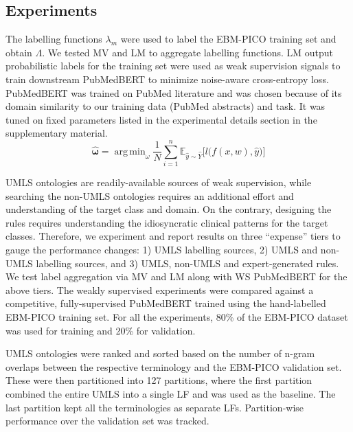 \documentclass[10.7pt,]{article}
\DeclareMathOperator*{\argmin}{arg\,min}
\begin{document}
\subsection{Experiments}\label{subsec:experiments}
%
The labelling functions $\lambda_{m}$ were used to label the EBM-PICO training set and obtain $\Lambda$. 
We tested MV and LM to aggregate labelling functions.
LM output probabilistic labels for the training set were used as weak supervision signals to train downstream PubMedBERT to minimize noise-aware cross-entropy loss.
PubMedBERT was trained on PubMed literature and was chosen because of its domain similarity to our training data (PubMed abstracts) and task.\cite{gu2021domain}
It was tuned on fixed parameters listed in the experimental details section in the supplementary material. 
%
\begin{equation}
\bm{\hat{\omega}} = \argmin_{\omega} \frac{1}{N} \sum_{i=1}^{n} \mathbb{ E }_{ \hat{y} \sim \hat{Y}} \big[ l \big( f(x, w), \hat{y} \big) \big]
\end{equation}
%

UMLS ontologies are readily-available sources of weak supervision, while searching the non-UMLS ontologies requires an additional effort and understanding of the target class and domain.
On the contrary, designing the rules requires understanding the idiosyncratic clinical patterns for the target classes.
Therefore, we experiment and report results on three ``expense'' tiers to gauge the performance changes: 1) UMLS labelling sources, 2) UMLS and non-UMLS labelling sources, and 3) UMLS, non-UMLS and expert-generated rules.
We test label aggregation via MV and LM along with WS PubMedBERT for the above tiers.
The weakly supervised experiments were compared against a competitive, fully-supervised PubMedBERT trained using the hand-labelled EBM-PICO training set.
For all the experiments, 80\% of the EBM-PICO dataset was used for training and 20\% for validation.


UMLS ontologies were ranked and sorted based on the number of n-gram overlaps between the respective terminology and the EBM-PICO validation set.
These were then partitioned into 127 partitions, where the first partition combined the entire UMLS into a single LF and was used as the baseline. 
The last partition kept all the terminologies as separate LFs.
Partition-wise performance over the validation set was tracked.
%
%
%
\end{document}
